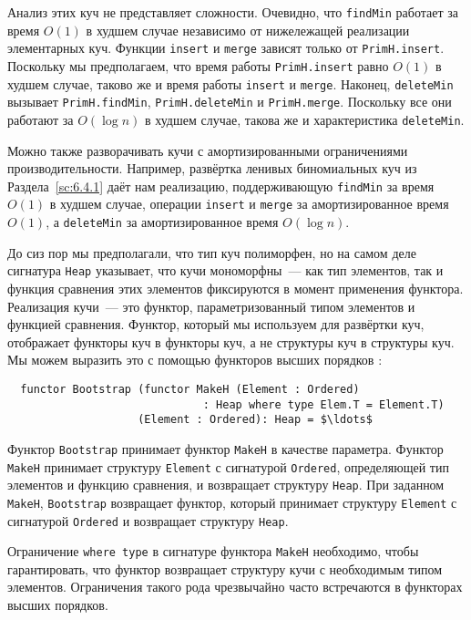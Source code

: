 Анализ этих куч не представляет сложности. Очевидно, что
\lstinline!findMin! работает за время $O(1)$ в худшем случае
независимо от нижележащей реализации элементарных куч. Функции
\lstinline!insert! и \lstinline!merge! зависят только от
\lstinline!PrimH.insert!.  Поскольку мы предполагаем, что время работы
\lstinline!PrimH.insert! равно $O(1)$ в худшем случае, таково же и
время работы \lstinline!insert! и \lstinline!merge!. Наконец,
\lstinline!deleteMin! вызывает \lstinline!PrimH.findMin!,
\lstinline!PrimH.deleteMin! и \lstinline!PrimH.merge!. Поскольку все
они работают за $O(\log n)$ в худшем случае, такова же и
характеристика \lstinline!deleteMin!.

\begin{remark}
  Можно также разворачивать кучи с амортизированными ограничениями
  производительности. Например, развёртка ленивых биномиальных куч из
  Раздела~\ref{sc:6.4.1} даёт нам реализацию, поддерживающую
  \lstinline!findMin! за время $O(1)$ в худшем случае, операции
  \lstinline!insert! и \lstinline!merge! за амортизированное время
  $O(1)$, а \lstinline!deleteMin! за амортизированное время $O(\log n)$.
\end{remark}

До сиз пор мы предполагали, что тип куч полиморфен, но на самом деле
сигнатура \lstinline!Heap! указывает, что кучи мономорфны~--- как тип
элементов, так и функция сравнения этих элементов фиксируются в момент
применения функтора. Реализация кучи~--- это функтор,
параметризованный типом элементов и функцией сравнения. Функтор,
который мы используем для развёртки куч, отображает функторы куч в
функторы куч, а не структуры куч в структуры куч. Мы можем выразить
это с помощью функторов высших порядков \cite{MacQueenTofte1994}:
\begin{lstlisting}
  functor Bootstrap (functor MakeH (Element : Ordered)
                              : Heap where type Elem.T = Element.T)
                    (Element : Ordered): Heap = $\ldots$
\end{lstlisting}
Функтор \lstinline!Bootstrap! принимает функтор \lstinline!MakeH! в
качестве параметра. Функтор \lstinline!MakeH! принимает структуру
\lstinline!Element! с сигнатурой \lstinline!Ordered!, определяющей тип
элементов и функцию сравнения, и возвращает структуру
\lstinline!Heap!. При заданном \lstinline!MakeH!,
\lstinline!Bootstrap! возвращает функтор, который принимает структуру
\lstinline!Element! с сигнатурой \lstinline!Ordered! и возвращает
структуру \lstinline!Heap!.

\begin{remark}
  Ограничение \lstinline!where type! в сигнатуре функтора
  \lstinline!MakeH! необходимо, чтобы гарантировать, что функтор
  возвращает структуру кучи с необходимым типом элементов. Ограничения
  такого рода чрезвычайно часто встречаются в функторах высших порядков.
\end{remark}

